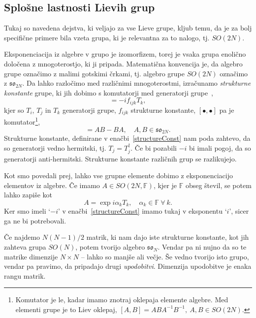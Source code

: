 \subsection{Splošne lastnosti Lievih grup}

Tukaj so navedena dejstva, ki veljajo za vse Lieve grupe, kljub temu, da je za bolj specifične
primere bila vzeta grupa, ki je relevantna za to nalogo, tj. $SO(2N)$.

Eksponenciacija iz algebre v grupo je izomorfizem, torej je vsaka grupa enolično določena z
mnogoterostjo, ki ji pripada. Matematična konvencija je, da algebro grupe označimo z malimi
gotskimi črkami, tj. algebro grupe $SO(2N)$ označimo z $\mathfrak{so}_{2N}$. Da lahko razločimo med
različnimi mnogoterostmi, izračunamo \emph{strukturne konstante} grupe, ki jih dobimo s komutatorji
med generatorji grupe~\cite{compact},
\begin{equation}
	[T_i, T_j] = -if_{ijk} T_k,
	\label{structureConst}
\end{equation}
kjer so $T_i$, $T_j$ in $T_k$ generatorji grupe, $f_{ijk}$ strukturne konstante, $[\bullet, \bullet]$
pa je komutator\footnote{Komutator je le, kadar imamo znotraj oklepaja elemente algebre. Med
elementi grupe je to Liev oklepaj, $[A,B] = ABA^{-1}B^{-1},\ A,B \in SO(2N)$.},
\begin{equation}
	[A, B] = AB - BA, \quad A,B \in \mathfrak{so}_{2N}.
\end{equation}
Strukturne konstante, definirane v enačbi~\eqref{structureConst} nam poda zahtevo, da so generatorji
vedno hermitski, tj. $T_j = T_j^\dagger$. Če bi pozabili $-i$ bi imali pogoj, da so generatorji
anti-hermitski. Strukturne konstante različnih grup se razlikujejo.

Kot smo povedali prej, lahko vse grupne elemente dobimo z eksponenciacijo elementov iz algebre.
Če imamo $A \in SO(2N, \mathbb{F})$, kjer je $\mathbb{F}$ obseg števil, se potem lahko zapiše kot
\begin{equation}
	A = \exp i\alpha_k T_k, \quad \alpha_k \in \mathbb{F}\ \forall\ k.
\end{equation}
Ker smo imeli `$-i$' v enačbi~\eqref{structureConst} imamo tukaj v eksponentu `$i$', sicer ga ne bi
potrebovali.

Če najdemo $N(N-1)/2$ matrik, ki nam dajo iste strukturne konstante, kot jih zahteva grupa
$SO(N)$, potem tvorijo algebro $\mathfrak{so}_N$. Vendar pa ni nujno da so te matrike dimenzije
$N\times N$ -- lahko so manjše ali večje. Še vedno tvorijo isto grupo, vendar pa pravimo,
da pripadajo drugi \emph{upodobitvi}. Dimenzija upodobitve je enaka rangu matrik.

